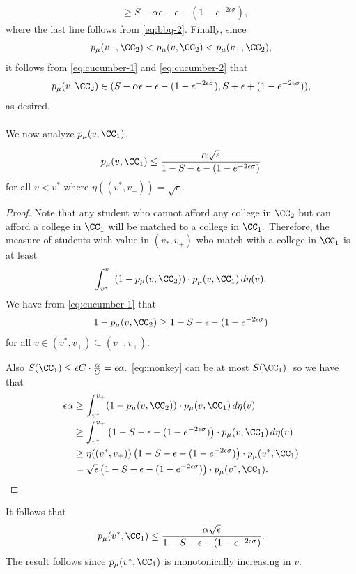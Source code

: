 \documentclass[10pt]{article}
\begin{document}
\begin{ReviewVerbatim}
\begin{align}
    &\ge S - \alpha\epsilon - \epsilon - (1 - e^{-2\epsilon\sigma}),\label{eq:cucumber-2}
\end{align}
where the last line follows from \eqref{eq:bbq-2}.
Finally, since
\begin{equation}
    p_\mu(v_-, \CC_2) < p_\mu(v, \CC_2) < p_\mu(v_+, \CC_2),
\end{equation}
it follows from \eqref{eq:cucumber-1} and \eqref{eq:cucumber-2} that
\begin{equation}
    p_\mu(v, \CC_2) \in (S - \alpha\epsilon - \epsilon - (1 - e^{-2\epsilon\sigma}), S + \epsilon + (1 - e^{-2\epsilon\sigma})),
\end{equation}
as desired.
\\
\\
We now analyze $p_\mu(v, \CC_1)$.
\begin{proposition}\label{prop:lt-small-firms}
\begin{equation}
    p_\mu(v, \CC_1) \le \frac{\alpha\sqrt{\epsilon}}{1 - S - \epsilon - (1 - e^{-2\epsilon\sigma})}
\end{equation}
for all $v < v^*$ where $\eta((v^*, v_+))=\sqrt{\epsilon}.$
\end{proposition}
\begin{proof}
Note that any student who cannot afford any college in $\CC_2$ but can afford a college in $\CC_1$ will be matched to a college in $\CC_1.$ Therefore, the measure of students with value in $(v_*, v_+)$ who match with a college in $\CC_1$ is at least
\begin{equation}\label{eq:monkey}
    \int_{v^*}^{v_+} (1 - p_\mu(v, \CC_2)) \cdot p_\mu(v, \CC_1)\,d\eta(v).
\end{equation}
We have from \eqref{eq:cucumber-1} that
\begin{equation}
    1 - p_\mu(v, \CC_2) \ge 1 - S - \epsilon - (1 - e^{-2\epsilon\sigma})
\end{equation}
for all $v\in (v^*, v_+)\subseteq (v_-, v_+).$

Also $S(\CC_1)\le \epsilon C\cdot \frac{\alpha}{C} = \epsilon\alpha.$ \eqref{eq:monkey} can be at most $S(\CC_1),$ so we have that
\begin{align}
    \epsilon\alpha &\ge \int_{v^*}^{v_+} (1 - p_\mu(v, \CC_2)) \cdot p_\mu(v, \CC_1)\,d\eta(v)\\
    &\ge \int_{v^*}^{v_+} \left(1 - S - \epsilon - (1 - e^{-2\epsilon\sigma})\right) \cdot p_\mu(v, \CC_1)\,d\eta(v)\\
    &\ge \eta((v^*,v_+)) \left(1 - S - \epsilon - (1 - e^{-2\epsilon\sigma})\right) \cdot p_\mu(v^*, \CC_1)\\
    &= \sqrt{\epsilon} \left(1 - S - \epsilon - (1 - e^{-2\epsilon\sigma})\right) \cdot p_\mu(v^*, \CC_1).
\end{align}
\end{proof}
It follows that
\begin{equation}
    p_\mu(v^*, \CC_1) \le \frac{\alpha\sqrt{\epsilon}}{1 - S - \epsilon - (1 - e^{-2\epsilon\sigma})}.
\end{equation}
The result follows since $p_\mu(v^*, \CC_1)$ is monotonically increasing in $v$.

\end{ReviewVerbatim}
\end{document}
